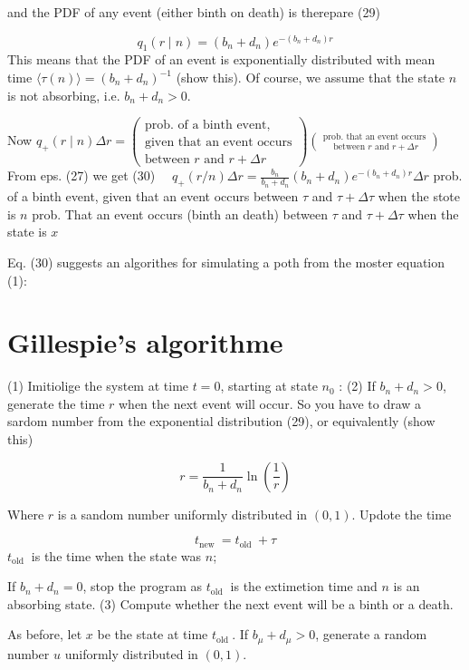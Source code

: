 and
the PDF of any event (either binth on death) is therepare
(29)

$$ q_{1}(r \mid n)=\left(b_{n}+d_{n}\right) e^{-\left(b_{n}+d_{n}\right) r}
$$ 
This means that the PDF of an event is exponentially distributed with mean time $\langle\tau(n)\rangle=\left(b_{n}+d_{n}\right)^{-1}$ (show this). Of course, we assume that the state $n$ is not absorbing, i.e. $b_{n}+d_{n}>0$.

Now $q_{+}(r \mid n) \Delta r=\left(\begin{array}{c} \text{prob. of a binth event,} \\ \text{given that an event occurs} \\ \text{between } r \text{ and } r+\Delta r\end{array}\right)\binom{\text { prob. that an event occurs }}{\text { between } r \text{ and } r+\Delta r}$
From eps. (27) we get
(30) $\quad q_{+}(r / n) \Delta r=\frac{b_{n}}{b_{n}+d_{n}}\left(b_{n}+d_{n}\right) e^{-\left(b_{n}+d_{n}\right) r} \Delta r$
prob. of a binth event, given that an event occurs between $\tau$ and $\tau+\Delta \tau$ when the stote is $n$
prob. That an event occurs (binth an death) between $\tau$ and $\tau+\Delta \tau$ when the state is $x$

Eq. (30) suggests an algorithes for simulating a poth from the moster equation (1):

\section*{Gillespie's algorithme}
(1) Imitiolige the system at time $t=0$, starting at state $n_{0}$ :
(2) If $b_{n}+d_{n}>0$, generate the time $r$ when the next event will
occur. So you have to draw a sardom number from the exponential distribution (29), or equivalently (show this)

$$ r=\frac{1}{b_{n}+d_{n}} \ln \left(\frac{1}{r}\right) $$ 

Where $r$ is a sandom number uniformly distributed in $(0,1)$. Updote the time

$$ t_{\text {new }}=t_{\text {old }}+\tau
$$ 
$t_{\text {old }}$ is the time when the state was $n$;

If $b_{n}+d_{n}=0$, stop the program as $t_{\text {old }}$ is the extimetion time and $n$ is an absorbing state.
(3) Compute whether the next event will be a binth or a death.

As before, let $x$ be the state at time $t_{\text {old }}$. If $b_{\mu}+d_{\mu}>0$, generate a random number $u$ uniformly distributed in $(0,1)$.

